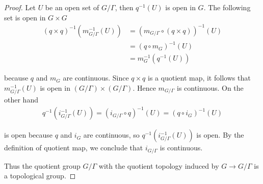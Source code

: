 \begin{proof}
	Let $U$ be an open set of $G/\Gamma$, then $q^{-1}(U)$ is open in $G$. The following set is open in $G\times G$
	\begin{align*}
		{(q \times q)}^{-1}(m_{G/\Gamma}^{-1}(U)) & = {(m_{G/\Gamma} \circ (q\times q))}^{-1}(U) \\
		                                          & = {(q\circ m_{G})}^{-1}(U)                   \\
		                                          & = m_{G}^{-1}(q^{-1}(U))
	\end{align*}

	because $q$ and $m_{G}$ are continuous. Since $q\times q$ is a quotient map, it follows that $m_{G/\Gamma}^{-1}(U)$ is open in $(G/\Gamma)\times (G/\Gamma)$. Hence $m_{G/\Gamma}$ is continuous. On the other hand
	\begin{align*}
		q^{-1}(i_{G/\Gamma}^{-1}(U)) = {(i_{G/\Gamma}\circ q)}^{-1}(U) = {(q\circ i_{G})}^{-1}(U)
	\end{align*}

	is open because $q$ and $i_{G}$ are continuous, so $q^{-1}(i_{G/\Gamma}^{-1}(U))$ is open. By the definition of quotient map, we conclude that $i_{G/\Gamma}$ is continuous.

	Thus the quotient group $G/\Gamma$ with the quotient topology induced by $G\to G/\Gamma$ is a topological group.
\end{proof}

